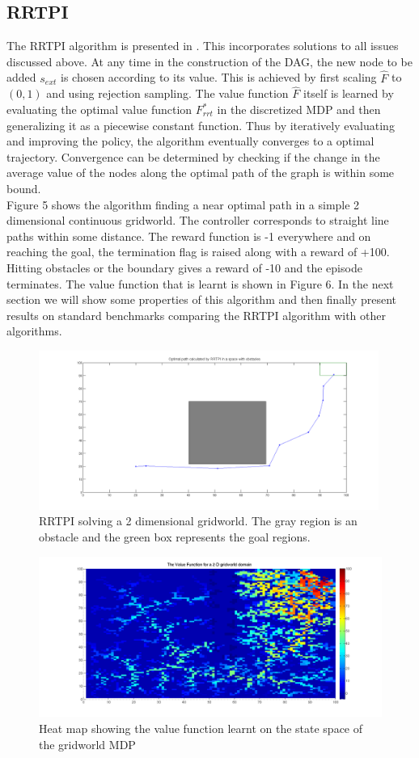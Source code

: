 \documentclass[wcp]{jmlr}
\begin{document}
\subsection*{RRTPI}
The RRTPI algorithm is presented in . This incorporates solutions to all issues discussed above. At any time in the construction of the DAG, the new node to be added $s_{ext}$ is chosen according to its value. This is achieved by first scaling $\hat{F}$ to $(0,1)$ and using rejection sampling. The value function $\hat{F}$ itself is learned by evaluating the optimal value function $F_{rrt}^*$ in the discretized MDP and then generalizing it as a piecewise constant function. Thus by iteratively evaluating and improving the policy, the algorithm eventually converges to a optimal trajectory.  Convergence can be determined by checking if the change in the average value of the nodes along the optimal path of the graph is within some bound.\\
Figure 5 shows the algorithm finding a near optimal path in a simple 2 dimensional continuous gridworld. The controller corresponds to straight line paths within some distance. The reward function is -1 everywhere and on reaching the goal, the termination flag is raised along with a reward of +100. Hitting obstacles or the boundary gives a reward of -10 and the episode terminates. The value function that is learnt is shown in Figure 6. In the next section we will show some properties of this algorithm and then finally present results on standard benchmarks comparing the RRTPI algorithm with other algorithms.

\begin{figure}[htb]
\centering
\label{fig:iter1}
\includegraphics[width=420px]{rrtpi1.png}
\caption{RRTPI solving a 2 dimensional gridworld. The gray region is an obstacle and the green box represents the goal regions.}
\end{figure}

\begin{figure}[htb]
\centering
\label{fig:val1}
\includegraphics[width=450px]{valufunction.png}
\caption{Heat map showing the value function learnt on the state space of the gridworld MDP}
\end{figure}
\end{document}
